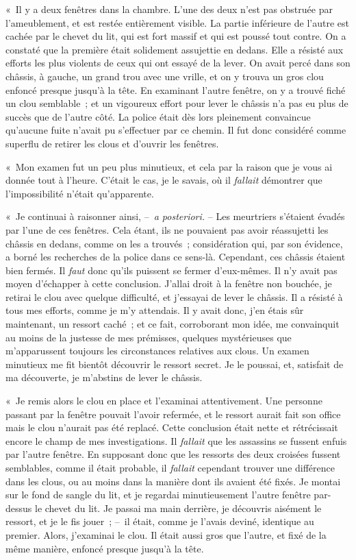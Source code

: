 \documentclass[french,twoside]{book} %
\begin{document}
« Il y a deux fenêtres dans la chambre. L’une des deux n’est pas obstruée par l’ameublement, et est restée entièrement visible. La partie inférieure de l’autre est cachée par le chevet du lit, qui est fort massif et qui est poussé tout contre. On a constaté que la première était solidement assujettie en dedans. Elle a résisté aux efforts les plus violents de ceux qui ont essayé de la lever. On avait percé dans son châssis, à gauche, un grand trou avec une vrille, et on y trouva un gros clou enfoncé presque jusqu’à la tête. En examinant l’autre fenêtre, on y a trouvé fiché un clou semblable ; et un vigoureux effort pour lever le châssis n’a pas eu plus de succès que de l’autre côté. La police était dès lors pleinement convaincue qu’aucune fuite n’avait pu s’effectuer par ce chemin. Il fut donc considéré comme superflu de retirer les clous et d’ouvrir les fenêtres.\par
« Mon examen fut un peu plus minutieux, et cela par la raison que je vous ai donnée tout à l’heure. C’était le cas, je le savais, où il \emph{fallait} démontrer que l’impossibilité n’était qu’apparente.\par
« Je continuai à raisonner ainsi, – \emph{a posteriori.} – Les meurtriers s’étaient évadés par l’une de ces fenêtres. Cela étant, ils ne pouvaient pas avoir réassujetti les châssis en dedans, comme on les a trouvés ; considération qui, par son évidence, a borné les recherches de la police dans ce sens-là. Cependant, ces châssis étaient bien fermés. Il \emph{faut} donc qu’ils puissent se fermer d’eux-mêmes. Il n’y avait pas moyen d’échapper à cette conclusion. J’allai droit à la fenêtre non bouchée, je retirai le clou avec quelque difficulté, et j’essayai de lever le châssis. Il a résisté à tous mes efforts, comme je m’y attendais. Il y avait donc, j’en étais sûr maintenant, un ressort caché ; et ce fait, corroborant mon idée, me convainquit au moins de la justesse de mes prémisses, quelques mystérieuses que m’apparussent toujours les circonstances relatives aux clous. Un examen minutieux me fit bientôt découvrir le ressort secret. Je le poussai, et, satisfait de ma découverte, je m’abstins de lever le châssis.\par
« Je remis alors le clou en place et l’examinai attentivement. Une personne passant par la fenêtre pouvait l’avoir refermée, et le ressort aurait fait son office mais le clou n’aurait pas été replacé. Cette conclusion était nette et rétrécissait encore le champ de mes investigations. Il \emph{fallait} que les assassins se fussent enfuis par l’autre fenêtre. En supposant donc que les ressorts des deux croisées fussent semblables, comme il était probable, il \emph{fallait} cependant trouver une différence dans les clous, ou au moins dans la manière dont ils avaient été fixés. Je montai sur le fond de sangle du lit, et je regardai minutieusement l’autre fenêtre par-dessus le chevet du lit. Je passai ma main derrière, je découvris aisément le ressort, et je le fis jouer ; – il était, comme je l’avais deviné, identique au premier. Alors, j’examinai le clou. Il était aussi gros que l’autre, et fixé de la même manière, enfoncé presque jusqu’à la tête.\par
\end{document}
